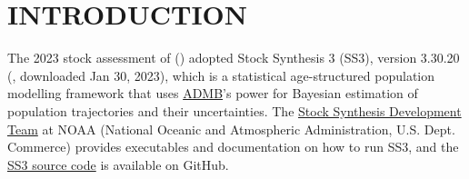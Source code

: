 \documentclass[11pt]{book}
\begin{document}
\newcommand{\LH}{}%
\newcommand{\RH}{}%
\newcommand{\LF}{}%
\newcommand{\RF}{}%

\lhead{\LH}\rhead{\RH}\lfoot{\LF}\rfoot{\RF}

\newcommand{\nSims}{\{40,000\,(for base-model)\,| 40,000\,(for area-model)\,| 20,000\,(for sensitivity)\}}%
\newcommand{\nChains}{8}%
\newcommand{\cSims}{\{5,000\,(base)\,| 5,000\,(area)\,| 2,500\,(sens)\}}%
\newcommand{\cBurn}{\{2,500\,(base)\,| 2,500\,(area)\,| 1,250\,(sens)\}}%
\newcommand{\cSamps}{\{2,500\,(base)\,| 2,500\,(area)\,| 1,250\,(sens)\}}%
\newcommand{\nThin}{\{10\,(base)\,| 10\,(area)\,| 5\,(sens)\}}%
\newcommand{\Nmcmc}{\{20,000\,(base)\,| 20,000\,(area)\,| 10,000\,(sens)\}}%
\newcommand{\Nbase}{\{20,000\,(base)\,| 20,000\,(area)\,| 10,000\,(sens)\}}%

\newcommand{\policyMax}{\{3,500\,t\,(5ABC)\,| 1,250\,t\,(3CD)\,| 1,500\,t\,(5DE)\}}
\newcommand{\policyInc}{various}
\newcommand{\currYear}{2024}%
\newcommand{\prevYear}{2023}%
\newcommand{\projYear}{2034}%

\section{INTRODUCTION}%

The 2023 stock assessment of \spn{} (\spc) adopted Stock Synthesis 3 (SS3), version 3.30.20 (\citealt{Methot-etal:2022}, downloaded Jan 30, 2023), which is a statistical age-structured population modelling framework \citep{Methot-Wetzel:2013} that uses \href{https://www.admb-project.org/}{ADMB}'s power for Bayesian estimation of population trajectories and their uncertainties.
The \href{https://vlab.ncep.noaa.gov/web/stock-synthesis/home}{Stock Synthesis Development Team} at NOAA (National Oceanic and Atmospheric Administration, U.S. Dept. Commerce) provides executables and documentation on how to run SS3, and the \href{https://github.com/nmfs-stock-synthesis/stock-synthesis}{SS3 source code} is available on GitHub.
\end{document}
